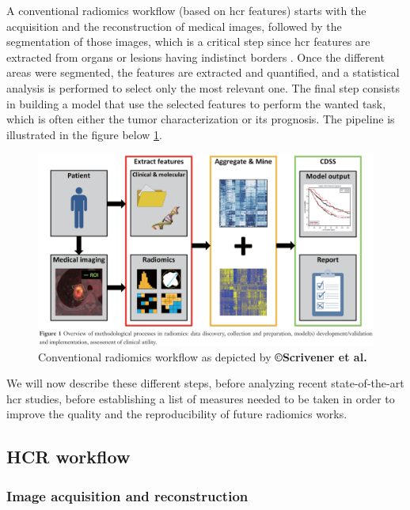A conventional radiomics workflow (based on \ac{hcr} features) starts
with the acquisition and the reconstruction of medical images, followed
by the segmentation of those images, which is a critical step since
\ac{hcr} features are extracted from organs or lesions having indistinct borders \cite{Gillies2016}. 
Once the different areas were segmented, the features are
extracted and quantified, and a statistical analysis is performed to
select only the most relevant one. The final step consists in building a
model that use the selected features to perform the wanted task,
which is often either the tumor characterization or its prognosis. The
pipeline is illustrated in the figure below \ref{Scrivener2016_Fig1}.


\begin{figure}[th!]
\centering
\includegraphics[width=0.7\linewidth]{images/image4}
\caption{Conventional radiomics workflow as depicted by \textbf{©Scrivener et al.} \cite{Scrivener2016}}
\label{Scrivener2016_Fig1}
\end{figure}


We will now describe these different steps, before analyzing recent
state-of-the-art \ac{hcr} studies, before establishing a list of
measures needed to be taken in order to improve the quality and the
reproducibility of future radiomics works.

\subsection{HCR workflow}\label{hcr-workflow}

\subsubsection{Image acquisition and reconstruction}\label{image-acquisition-and-reconstruction}

